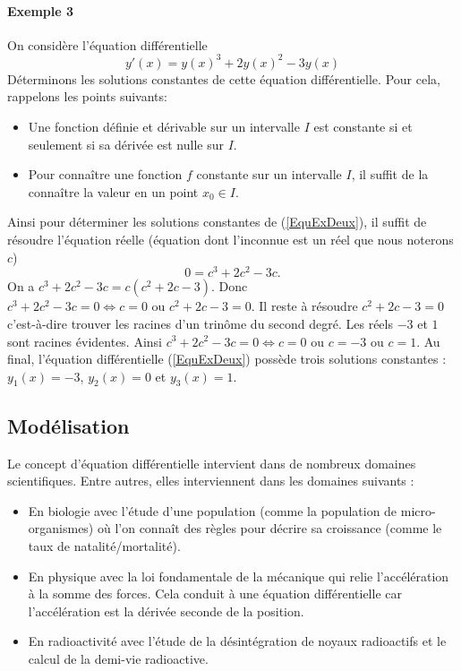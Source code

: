 \documentclass[11pt,class=report,crop=false]{standalone}
\begin{document}
\paragraph*{Exemple 3} On considère l'équation différentielle 
\begin{equation}\label{EquExDeux}
y'(x)=y(x)^3+2y(x)^2-3y(x)
\end{equation}
Déterminons les solutions constantes de cette équation différentielle. Pour cela, rappelons les points suivants:
 \begin{itemize}
 	\item Une fonction définie et dérivable sur un intervalle $I$ est constante si et seulement si sa dérivée est nulle sur $I$.
 	\item Pour connaître une fonction $f$ constante sur un intervalle $I$, il suffit de la connaître la valeur en un point $x_0\in I$. 
 \end{itemize}
Ainsi pour déterminer les solutions constantes de (\ref{EquExDeux}), il suffit de résoudre l'équation réelle (équation dont l'inconnue est un réel que nous noterons $c$) 
 \begin{equation}\label{EquConst}
	0=c^3+2c^2-3c.
 \end{equation}
 On a $c^3+2c^2-3c=c(c^2+2c-3)$. Donc $c^3+2c^2-3c=0\iff c=0 \text{ ou } c^2+2c-3=0$. Il reste à résoudre $c^2+2c-3=0$ c'est-à-dire trouver les racines d'un trinôme du second degré. Les réels $-3$ et $1$ sont racines évidentes. Ainsi  
 $c^3+2c^2-3c=0\iff c=0 \text{ ou } c=-3 \text{ ou } c=1$. Au final, l'équation différentielle (\ref{EquExDeux}) possède trois solutions constantes : $y_1(x)=-3$, $y_2(x)=0$ et $y_3(x)=1$.




\subsection*{Modélisation}
Le concept d'équation différentielle intervient dans de nombreux domaines scientifiques. Entre autres, elles interviennent dans les domaines suivants :
\begin{itemize}
	\item En biologie avec l'étude d'une population (comme la population de micro-organismes) où l'on connaît des règles pour décrire sa croissance (comme le taux de natalité/mortalité).

	\item En physique avec la loi fondamentale de la mécanique qui relie l'accélération à la somme des forces. Cela conduit à une équation différentielle car l'accélération est la dérivée seconde de la position.

	\item En radioactivité avec l'étude de la désintégration de noyaux radioactifs et le calcul de la demi-vie radioactive.
 \end{itemize}
\end{document}

